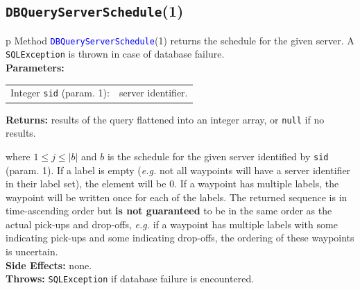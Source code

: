 \subsection{\texttt{DBQueryServerSchedule}(1)}
\begin{tabular}{p{\textwidth}}
\toprule
{}
Method \textcolor{blue}{{\tt{}\protect{}DBQueryServerSchedule}}(1) returns the schedule
for the given server.
A {\tt{}SQLException} is thrown in case of database failure.\\
\midrule
\textbf{Parameters:} \\
\begin{tabular}{lp{116mm}}
Integer {\tt{}sid} (param. 1):&server identifier.\\
\end{tabular}
\textbf{Returns:} results of the query flattened into an integer array,
or {\tt{}null} if no results.


where $1\leq j\leq |b|$ and $b$ is the schedule for the
given server  identified by {\tt{}sid} (param. 1).
If a label is empty (\textit{e.g.} not all waypoints will have a server
identifier in their label set), the element will be 0. If a waypoint has
multiple labels, the waypoint will be written once for each of the labels.
The returned sequence is in time-ascending order but \textbf{is not guaranteed}
to be in the same order as the actual pick-ups and drop-offs, \textit{e.g.} if a
waypoint has multiple labels with some indicating pick-ups and some indicating
drop-offs, the ordering of these waypoints is uncertain.\\
\textbf{Side Effects:} none.\\
\textbf{Throws:} {\tt{}SQLException} if database failure is encountered.\\
\bottomrule
\end{tabular}
\nwenddocs{}\endmoddef{}
